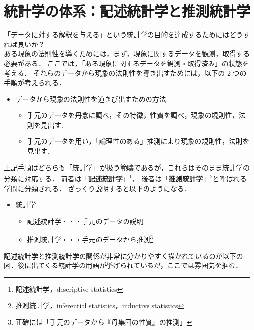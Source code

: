 \newpage

\section{統計学の体系：記述統計学と推測統計学}

「データに対する解釈を与える」という統計学の目的を達成するためにはどうすれば良いか？\\

ある現象の法則性を導くためには，まず，現象に関するデータを観測，取得する必要がある．
ここでは，「ある現象に関するデータを観測・取得済み」の状態を考える．
それらのデータから現象の法則性を導き出すためには，以下の 2 つの手順が考えられる．

\begin{itemize}
  \item データから現象の法則性を道きび出すための方法
        \begin{itemize}
          \item 手元のデータを丹念に調べ，その特徴，性質を調べ，現象の規則性，法則を見出す．
          \item 手元のデータを用い，「論理性のある」推測により現象の規則性，法則を見出す．
        \end{itemize}
\end{itemize}

上記手順はどちらも「統計学」が扱う範疇であるが，これらはそのまま統計学の分類に対応する．
前者は「\textbf{記述統計学}」\footnote{記述統計学，descriptive statistics}，
後者は「\textbf{推測統計学}」\footnote{推測統計学，inferential statistics，inductive statistics}と呼ばれる学問に分類される．
ざっくり説明すると以下のようになる．

\begin{itemize}
  \item 統計学
        \begin{itemize}
          \item 記述統計学・・・手元のデータの説明
          \item 推測統計学・・・手元のデータから推測\footnote{正確には「手元のデータから『母集団の性質』の推測」}
        \end{itemize}
\end{itemize}

記述統計学と推測統計学の関係が非常に分かりやすく描かれているのが以下の図．後に出てくる統計学の用語が挙げられているが，ここでは雰囲気を掴む．

